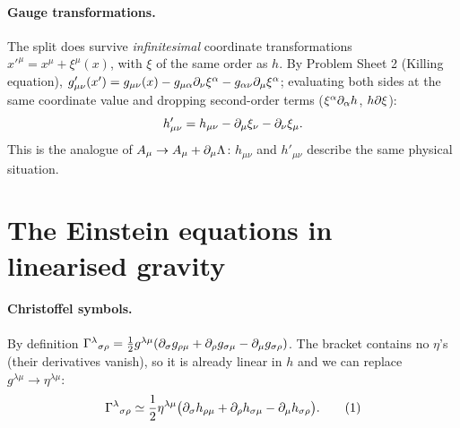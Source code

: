 \paragraph{Gauge transformations.} The split does survive \emph{infinitesimal} coordinate transformations $x'^\mu=x^\mu+\xi^\mu(x)$, with $\xi$ of the same order as $h$. By Problem Sheet 2 (Killing equation), $g'_{\mu\nu}(x')=g_{\mu\nu}(x)-g_{\mu\alpha}\partial_\nu\xi^\alpha-g_{\alpha\nu}\partial_\mu\xi^\alpha$; evaluating both sides at the same coordinate value and dropping second-order terms ($\xi^\alpha\partial_\alpha h$, $h\partial\xi$):
\begin{equation}
  h'_{\mu\nu}=h_{\mu\nu}-\partial_\mu\xi_\nu-\partial_\nu\xi_\mu .
  \label{eq:gauge-h}
\end{equation}
This is the analogue of $A_\mu\to A_\mu+\partial_\mu\Lambda$: $h_{\mu\nu}$ and $h'_{\mu\nu}$ describe the same physical situation.

\section{The Einstein equations in linearised gravity}

\paragraph{Christoffel symbols.} By definition $\Gamma^{\lambda}{}_{\sigma\rho}=\frac12g^{\lambda\mu}(\partial_\sigma g_{\rho\mu}+\partial_\rho g_{\sigma\mu}-\partial_\mu g_{\sigma\rho})$. The bracket contains no $\eta$'s (their derivatives vanish), so it is already linear in $h$ and we can replace $g^{\lambda\mu}\to\eta^{\lambda\mu}$:
\begin{equation}
  \Gamma^{\lambda}{}_{\sigma\rho}\simeq\frac12\eta^{\lambda\mu}\big(\partial_\sigma h_{\rho\mu}+\partial_\rho h_{\sigma\mu}-\partial_\mu h_{\sigma\rho}\big).\tag{1}
\end{equation}
